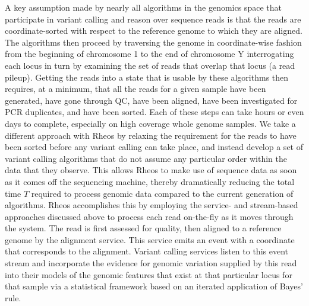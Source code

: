 A key assumption made by nearly all algorithms in the genomics space that participate in variant calling and reason over sequence reads is that the reads are coordinate-sorted with respect to the reference genome to which they are aligned\autocite{li2009sequence,garrison2012haplotype,cibulskis2013sensitive,rimmer2014integrating}. The algorithms then proceed by traversing the genome in coordinate-wise fashion from the beginning of chromosome 1 to the end of chromosome Y interrogating each locus in turn by examining the set of reads that overlap that locus (a read pileup)\autocite{li2009sequence}. Getting the reads into a state that is usable by these algorithms then requires, at a minimum, that all the reads for a given sample have been generated, have gone through QC\autocite{whalley2017framework}, have been aligned\autocite{li2010survey}, have been investigated for PCR duplicates\autocite{van2013fastq}, and have been sorted\autocite{van2013fastq}. Each of these steps can take hours or even days to complete, especially on high coverage whole genome samples. We take a different approach with Rheos by relaxing the requirement for the reads to have been sorted before any variant calling can take place, and instead develop a set of variant calling algorithms that do not assume any particular order within the data that they observe. This allows Rheos to make use of sequence data as soon as it comes off the sequencing machine, thereby dramatically reducing the total time $T$ required to process genomic data compared to the current generation of algorithms. Rheos accomplishes this by employing the service- and stream-based approaches discussed above to process each read on-the-fly as it moves through the system. The read is first assessed for quality, then aligned to a reference genome by the alignment service. This service emits an event with a coordinate that corresponds to the alignment. Variant calling services listen to this event stream and incorporate the evidence for genomic variation supplied by this read into their models of the genomic features that exist at that particular locus for that sample via a statistical framework based on an iterated application of Bayes' rule\autocite{zacks1971theory,berger2013statistical}. 

